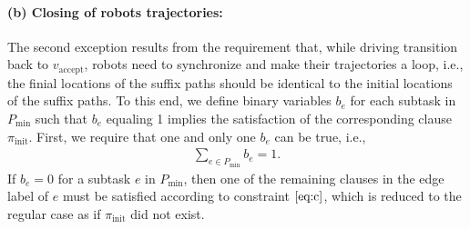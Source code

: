 \documentclass[Afour,sageh,times]{sagej}
\newcommand{\auto}[1]{\ccalA_{\textup{#1}}}
\newcommand{\vertex}[1]{v_{\textup{#1}}}
\begin{document}
{{%
\paragraph{\quad (b) Closing of robots trajectories:} The second exception results from the requirement that, while driving transition back to $v_{\text{accept}}$, robots need to synchronize and make their trajectories a loop, i.e., the finial locations of the suffix paths should be identical to the initial locations of the suffix paths.
To this end, we define binary variables $b_e$ for each subtask in $P_{\text{min}}$ such that $b_e$ equaling 1 implies the satisfaction of the corresponding clause $\pi_{\text{init}}$. First, we require that one  and only one $b_e$ can be true, i.e.,
\begin{align}\label{eq:one_suffix}
  \sum_{e \in P_{\text{min}}} b_e = 1.
\end{align}
If $b_e=0$ for a subtask $e$ in $P_{\text{min}}$, then one of the remaining clauses in the edge label of $e$ must be satisfied according to constraint $\eqref{eq:c}$, which is reduced to the regular case as if $\pi_{\text{init}}$ did not exist.

}}
\end{document}
